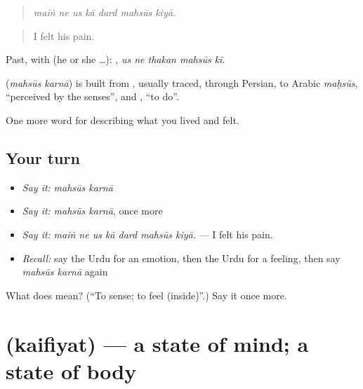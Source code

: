 \begin{quote}
      
\end{quote}

\begin{quote}
\emph{maiṅ ne us kā dard mahsūs kiyā.}
\end{quote}

\begin{quote}
I felt his pain.
\end{quote}

Past, with  (he or she …):     , \emph{us ne thakan mahsūs kī}.

\begin{cousinweb}
\textbf{ } (\emph{mahsūs karnā}) is built from \textbf{}, usually traced, through Persian, to Arabic \emph{maḥsūs}, \textquotedblleft{}perceived by the senses\textquotedblright{}, and \textbf{}, \textquotedblleft{}to do\textquotedblright{}.
\end{cousinweb}

\begin{grammarlens}[title={What you've built}]
One more word for describing what you lived and felt.
\end{grammarlens}

\subsection*{Your turn}
\begin{itemize}
\raggedright
  \item \emph{Say it:} \emph{mahsūs karnā}
  \item \emph{Say it:} \emph{mahsūs karnā}, once more
  \item \emph{Say it:} \emph{maiṅ ne us kā dard mahsūs kiyā.} — I felt his pain.
  \item \emph{Recall:} say the Urdu for an emotion, then the Urdu for a feeling, then say \emph{mahsūs karnā} again
\end{itemize}

\begin{tcolorbox}[breakable,colback=teal!4,colframe=teal!35!black,title={Before you move on}]
What does   mean? (\textquotedblleft{}To sense; to feel (inside)\textquotedblright{}.) Say it once more.
\end{tcolorbox}
\section[\texorpdfstring{\ur{کیفیت} (kaifiyat)}{کیفیت (kaifiyat)}]{ (kaifiyat) — a state of mind; a state of body}

